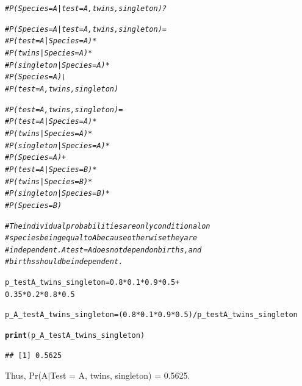 \documentclass[12pt]{article}\usepackage[]{graphicx}\usepackage[]{color}
\makeatletter
\newcommand{\hlnum}[1]{\textcolor[rgb]{0.686,0.059,0.569}{#1}}%
\newcommand{\hlcom}[1]{\textcolor[rgb]{0.678,0.584,0.686}{\textit{#1}}}%
\newcommand{\hlopt}[1]{\textcolor[rgb]{0,0,0}{#1}}%
\newcommand{\hlstd}[1]{\textcolor[rgb]{0.345,0.345,0.345}{#1}}%
\newcommand{\hlkwb}[1]{\textcolor[rgb]{0.69,0.353,0.396}{#1}}%
\newcommand{\hlkwd}[1]{\textcolor[rgb]{0.737,0.353,0.396}{\textbf{#1}}}%
\newenvironment{kframe}{%
 \def\at@end@of@kframe{}%
 \ifinner\ifhmode%
  \def\at@end@of@kframe{\end{minipage}}%
  \begin{minipage}{\columnwidth}%
 \fi\fi%
 \def\FrameCommand##1{\hskip\@totalleftmargin \hskip-\fboxsep
 \colorbox{shadecolor}{##1}\hskip-\fboxsep
     \hskip-\linewidth \hskip-\@totalleftmargin \hskip\columnwidth}%
 \MakeFramed {\advance\hsize-\width
   \@totalleftmargin\z@ \linewidth\hsize
   \@setminipage}}%
 {\par\unskip\endMakeFramed%
 \at@end@of@kframe}
\newenvironment{knitrout}{}{} %
\makeatother
\begin{document}
\begin{knitrout}
\color{fgcolor}\begin{kframe}
\begin{alltt}
\hlcom{# P(Species = A | test = A, twins, singleton)?}

\hlcom{# P(Species = A | test = A, twins, singleton) =}
\hlcom{#               P(test = A | Species = A) *}
\hlcom{#               P(twins | Species = A) *}
\hlcom{#               P(singleton | Species = A) *}
\hlcom{#               P(Species = A) \textbackslash{}}
\hlcom{#               P(test = A, twins, singleton)}

\hlcom{# P(test = A, twins, singleton) =}
\hlcom{#               P(test = A | Species = A) *}
\hlcom{#               P(twins | Species = A) *}
\hlcom{#               P(singleton | Species = A) *}
\hlcom{#               P(Species = A) +}
\hlcom{#               P(test = A | Species = B) *}
\hlcom{#               P(twins | Species = B) *}
\hlcom{#               P(singleton | Species = B) *}
\hlcom{#               P(Species = B)}

\hlcom{# The individual probabilities are only conditional on}
\hlcom{# species being equal to A because otherwise they are}
\hlcom{# independent. A test = A does not depend on births, and}
\hlcom{# births should be independent.}

\hlstd{p_testA_twins_singleton} \hlkwb{=} \hlnum{0.8} \hlopt{*} \hlnum{0.1} \hlopt{*} \hlnum{0.9} \hlopt{*} \hlnum{0.5} \hlopt{+}
                        \hlnum{0.35} \hlopt{*} \hlnum{0.2} \hlopt{*} \hlnum{0.8} \hlopt{*} \hlnum{0.5}

\hlstd{p_A_testA_twins_singleton} \hlkwb{=} \hlstd{(}\hlnum{0.8} \hlopt{*} \hlnum{0.1} \hlopt{*} \hlnum{0.9} \hlopt{*} \hlnum{0.5}\hlstd{)} \hlopt{/} \hlstd{p_testA_twins_singleton}

\hlkwd{print}\hlstd{(p_A_testA_twins_singleton)}
\end{alltt}
\begin{verbatim}
## [1] 0.5625
\end{verbatim}
\end{kframe}
\end{knitrout}

Thus, Pr(A$\vert$Test = A, twins, singleton) = 0.5625.
\end{document}
